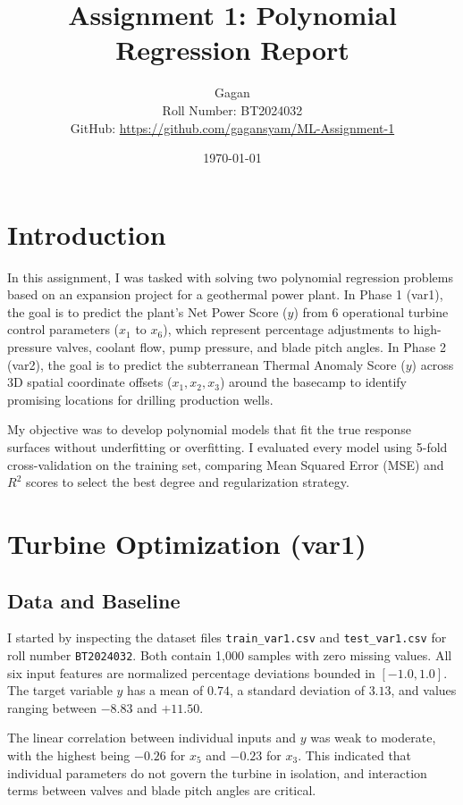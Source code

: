 \documentclass[11pt,a4paper]{article}
\title{\textbf{Assignment 1: Polynomial Regression Report}}
\author{Gagan \\ Roll Number: BT2024032 \\ GitHub: \url{https://github.com/gagansyam/ML-Assignment-1}}
\date{\today}
\begin{document}
\maketitle

\section{Introduction}
In this assignment, I was tasked with solving two polynomial regression problems based on an expansion project for a geothermal power plant. In Phase 1 (var1), the goal is to predict the plant's Net Power Score ($y$) from 6 operational turbine control parameters ($x_1$ to $x_6$), which represent percentage adjustments to high-pressure valves, coolant flow, pump pressure, and blade pitch angles. In Phase 2 (var2), the goal is to predict the subterranean Thermal Anomaly Score ($y$) across 3D spatial coordinate offsets ($x_1, x_2, x_3$) around the basecamp to identify promising locations for drilling production wells.

My objective was to develop polynomial models that fit the true response surfaces without underfitting or overfitting. I evaluated every model using 5-fold cross-validation on the training set, comparing Mean Squared Error (MSE) and $R^2$ scores to select the best degree and regularization strategy.

\section{Turbine Optimization (var1)}

\subsection{Data and Baseline}
I started by inspecting the dataset files \texttt{train\_var1.csv} and \texttt{test\_var1.csv} for roll number \texttt{BT2024032}. Both contain 1,000 samples with zero missing values. All six input features are normalized percentage deviations bounded in $[-1.0, 1.0]$. The target variable $y$ has a mean of $0.74$, a standard deviation of $3.13$, and values ranging between $-8.83$ and $+11.50$. 

The linear correlation between individual inputs and $y$ was weak to moderate, with the highest being $-0.26$ for $x_5$ and $-0.23$ for $x_3$. This indicated that individual parameters do not govern the turbine in isolation, and interaction terms between valves and blade pitch angles are critical.
\end{document}
